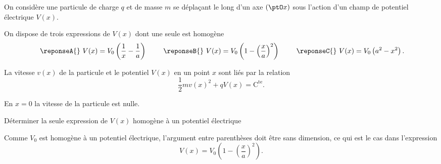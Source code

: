 \hauteurLargeurCadreReponse		{8mm}{2.5cm}
\typeEntrainement				{} %
\initialisationEntrainement

On considère une particule de charge $q$ et de masse $m$ se déplaçant le long d'un axe $(\ptO x)$ sous l'action d'un champ de potentiel électrique $V(x)$.

On dispose de trois expressions de $V(x)$ dont une seule est homogène
\[
	\text{ \reponseA{} } V(x) = V_0 \left( \frac{1}{x} - \frac{1}{a} \right) \qquad
	\text{ \reponseB{} } V(x) = V_0 \left( 1 - \left(\frac{x}{a}\right)^2\right) \qquad
	\text{ \reponseC{} } V(x) = V_0 \left( a^2 - x^2\right).
\]


La vitesse $v(x)$ de la particule et le potentiel $V(x)$ en un point $x$ sont liés par la relation
\begin{equation}
	\frac{1}{2}mv(x)^2 + qV(x) = \mathrm{C^{te}}. \label{relation_v_V}
\end{equation}

En $x=0$ la vitesse de la particule est nulle.

\debutEntrainement




\begin{enonce}
	Déterminer la seule expression de $V(x)$ homogène à un potentiel électrique
\end{enonce}

\reponse{\reponseB{}}

\begin{corrige}
	Comme $V_0$ est homogène à un potentiel électrique, l'argument entre parenthèses doit être sans dimension, ce qui est le cas dans l'expression
	\[
		V(x) = V_0 \left( 1 - \left(\frac{x}{a}\right)^2\right).	
	\]
\end{corrige}




